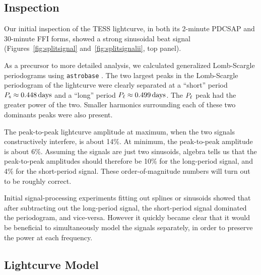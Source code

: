 \documentclass[12pt,twocolumn,tighten]{aastex62}
\begin{document}
\subsection{Inspection}

Our initial inspection of the TESS lightcurve, in both its 2-minute
PDCSAP and 30-minute FFI forms, showed a strong sinusoidal beat signal
(Figures~\ref{fig:splitsignal} and~\ref{fig:splitsignalii}, top
panel).

As a precursor to more detailed analysis, we calculated generalized
Lomb-Scargle periodograms using \texttt{astrobase}
\citep{lomb_1976,scargle_studies_1982,vanderplas_periodograms_2015,bhatti_astrobase_2018}.
The two largest peaks in the Lomb-Scargle periodogram of the
lightcurve were clearly separated at a ``short'' period $P_{\rm s}
\approx 0.448\,{\rm days}$ and a ``long'' period $P_{\rm \ell} \approx
0.499\,{\rm days}$.  The $P_{\rm \ell}$ peak had the greater power of
the two.  Smaller harmonics surrounding each of these two dominants
peaks were also present.


The peak-to-peak lightcurve amplitude at maximum, when the two signals
constructively interfere, is about 14\%.  At minimum, the peak-to-peak
amplitude is about 6\%.  Assuming the signals are just two sinusoids,
algebra tells us that the peak-to-peak amplitudes should therefore be
10\% for the long-period signal, and 4\% for the short-period signal.
These order-of-magnitude numbers will turn out to be roughly correct.

Initial signal-processing experiments fitting out splines or sinusoids
showed that after subtracting out the long-period signal, the
short-period signal dominated the periodogram, and vice-versa.
However it quickly became clear that it would be beneficial to
simultaneously model the signals separately, in order to preserve the
power at each frequency.




\subsection{Lightcurve Model}
\end{document}
